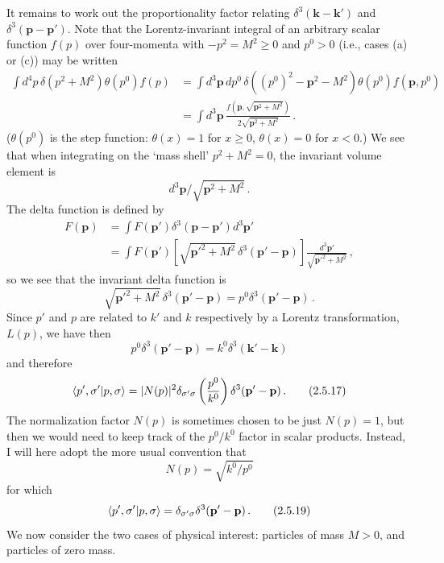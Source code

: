 It remains to work out the proportionality factor relating
$\delta^3(\mathbf{k}-\mathbf{k}')$ and
$\delta^3(\mathbf{p}-\mathbf{p}')$. Note that the Lorentz-invariant integral
of an arbitrary scalar function $f(p)$ over four-momenta with
$-p^2=M^2\geq0$ and $p^0>0$ (i.e., cases (a) or (c)) may be written
\[
\begin{aligned}
\int d^4p\,\delta(p^2+M^2)\theta(p^0)f(p)
&=\int d^3\mathbf{p}\,dp^0\,
\delta((p^0)^2-\mathbf{p}^2-M^2)\theta(p^0)f(\mathbf{p},p^0)\\
&=\int d^3\mathbf{p}\,
\frac{f(\mathbf{p},\sqrt{\mathbf{p}^2+M^2})}
{2\sqrt{\mathbf{p}^2+M^2}}\,.
\end{aligned}
\]
($\theta(p^0)$ is the step function: $\theta(x)=1$ for $x\geq0$,
$\theta(x)=0$ for $x<0$.) We see that when integrating on the `mass shell'
$p^2+M^2=0$, the invariant volume element is
\begin{equation}
d^3\mathbf{p}/\sqrt{\mathbf{p}^2+M^2}\,.
\tag{2.5.15}\label{eq:2.5.15}
\end{equation}
The delta function is defined by
\[
\begin{aligned}
F(\mathbf{p})
&=\int F(\mathbf{p}')\delta^3(\mathbf{p}-\mathbf{p}')d^3\mathbf{p}'\\
&=\int F(\mathbf{p}')
\left[\sqrt{\mathbf{p}'^2+M^2}\,
\delta^3(\mathbf{p}'-\mathbf{p})\right]
\frac{d^3\mathbf{p}'}{\sqrt{\mathbf{p}'^2+M^2}}\,,
\end{aligned}
\]
so we see that the invariant delta function is
\begin{equation}
\sqrt{\mathbf{p}'^2+M^2}\,\delta^3(\mathbf{p}'-\mathbf{p})
=p^0\delta^3(\mathbf{p}'-\mathbf{p})\,.
\tag{2.5.16}\label{eq:2.5.16}
\end{equation}
Since $p'$ and $p$ are related to $k'$ and $k$ respectively by a Lorentz
transformation, $L(p)$, we have then
\[
p^0\delta^3(\mathbf{p}'-\mathbf{p})
=k^0\delta^3(\mathbf{k}'-\mathbf{k})
\]
and therefore
\begin{equation}
\langle p',\sigma' | p,\sigma\rangle
=|N(p)|^2\delta_{\sigma'\sigma}
\left(\frac{p^0}{k^0}\right)
\delta^3(\mathbf{p}'-\mathbf{p})\,.
\tag{2.5.17}\label{eq:2.5.17}
\end{equation}
The normalization factor $N(p)$ is sometimes chosen to be just $N(p)=1$, but
then we would need to keep track of the $p^0/k^0$ factor in scalar products.
Instead, I will here adopt the more usual convention that
\begin{equation}
N(p)=\sqrt{k^0/p^0}
\tag{2.5.18}\label{eq:2.5.18}
\end{equation}
for which
\begin{equation}
\langle p',\sigma' | p,\sigma\rangle
=\delta_{\sigma'\sigma}\delta^3(\mathbf{p}'-\mathbf{p})\,.
\tag{2.5.19}\label{eq:2.5.19}
\end{equation}
We now consider the two cases of physical interest: particles of mass $M>0$,
and particles of zero mass.

